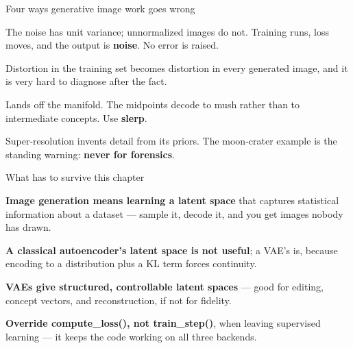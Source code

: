 \documentclass[aspectratio=169,11pt,t]{beamer}
\begin{document}
\begin{frame}[shrink=25]{Four ways generative image work goes wrong}
\begin{minipage}[t]{0.494\textwidth}
\begin{icardbad}
The noise has unit variance; unnormalized images do not. Training runs, loss moves, and the output is \textbf{noise}. No error is raised.
\end{icardbad}
\end{minipage}%
\hfill
\begin{minipage}[t]{0.494\textwidth}
\begin{icardbad}
Distortion in the training set becomes distortion in every generated image, and it is very hard to diagnose after the fact.
\end{icardbad}
\end{minipage}%


\vskip 4pt

\begin{minipage}[t]{0.494\textwidth}
\begin{icardwarn}
Lands off the manifold. The midpoints decode to mush rather than to intermediate concepts. Use \textbf{slerp}.
\end{icardwarn}
\end{minipage}%
\hfill
\begin{minipage}[t]{0.494\textwidth}
\begin{icardwarn}
Super-resolution invents detail from its priors. The moon-crater example is the standing warning: \textbf{never for forensics}.
\end{icardwarn}
\end{minipage}%
\end{frame}

\begin{frame}[shrink=25]{What has to survive this chapter}
\begin{isteps}
\item \textbf{Image generation means learning a latent space} that captures statistical information about a dataset --- sample it, decode it, and you get images nobody has drawn.
\item \textbf{A classical autoencoder's latent space is not useful}; a VAE's is, because encoding to a distribution plus a KL term forces continuity.
\item \textbf{VAEs give structured, controllable latent spaces} --- good for editing, concept vectors, and reconstruction, if not for fidelity.
\item \textbf{Override compute\_loss(), not train\_step()}, when leaving supervised learning --- it keeps the code working on all three backends.
\end{isteps}
\end{frame}
\end{document}
